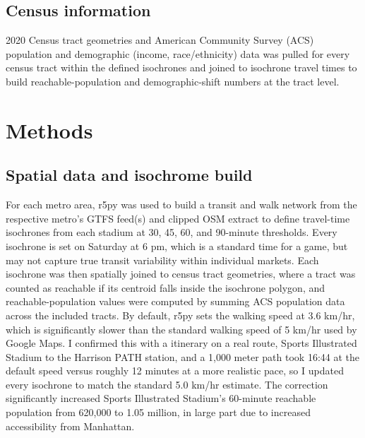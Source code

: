 \documentclass[9pt,twoside]{pnas-new}
\begin{document}
\subsection{Census information} 2020 Census tract geometries and American Community Survey (ACS) population and demographic (income, race/ethnicity) data was pulled for every census tract within the defined isochrones and joined to isochrone travel times to build reachable-population and demographic-shift numbers at the tract level.

\section{Methods}
\subsection{Spatial data and isochrome build}
For each metro area, r5py was used to build a transit and walk network from the respective metro's GTFS feed(s) and clipped OSM extract to define travel-time isochrones from each stadium at 30, 45, 60, and 90-minute thresholds. Every isochrone is set on Saturday at 6 pm, which is a standard time for a game, but may not capture true transit variability within individual markets. Each isochrone was then spatially joined to census tract geometries, where a tract was counted as reachable if its centroid falls inside the isochrone polygon, and reachable-population values were computed by summing ACS population data across the included tracts. By default, r5py sets the walking speed at 3.6 km/hr, which is significantly slower than the standard walking speed of 5 km/hr used by Google Maps. I confirmed this with a itinerary on a real route, Sports Illustrated Stadium to the Harrison PATH station, and a 1,000 meter path took 16:44 at the default speed versus roughly 12 minutes at a more realistic pace, so I updated every isochrone to match the standard 5.0 km/hr estimate. The correction significantly increased Sports Illustrated Stadium's 60-minute reachable population from 620,000 to 1.05 million, in large part due to increased accessibility from Manhattan. 
\end{document}
